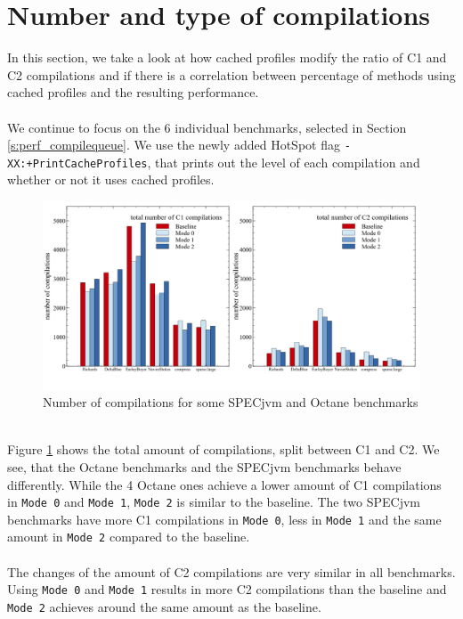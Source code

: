 \section{Number and type of compilations}
\label{s:perf_compilenumber}
In this section, we take a look at how cached profiles modify the ratio of C1 and C2 compilations and if there is a correlation between percentage of methods using cached profiles and the resulting performance.
\\\\
We continue to focus on the 6 individual benchmarks, selected in Section \ref{s:perf_compilequeue}.
We use the newly added HotSpot flag \texttt{-XX:+PrintCacheProfiles}, that prints out the level of each compilation and whether or not it uses cached profiles.
\begin{figure}[ht!]
  \begin{center}
    \centering
    \includegraphics[width=1.0\textwidth]{figures/queue_total.png}
    \caption{Number of compilations for some SPECjvm and Octane benchmarks}
    \label{f:queue_total}
  \end{center}
\end{figure}
\\
Figure \ref{f:queue_total} shows the total amount of compilations, split between C1 and C2.
We see, that the Octane benchmarks and the SPECjvm benchmarks behave differently. While the 4 Octane ones achieve a lower amount of C1 compilations in \texttt{Mode 0} and \texttt{Mode 1}, \texttt{Mode 2} is similar to the baseline. The two SPECjvm benchmarks have more C1 compilations in \texttt{Mode 0}, less in \texttt{Mode 1} and the same amount in \texttt{Mode 2} compared to the baseline.
\\\\
The changes of the amount of C2 compilations are very similar in all benchmarks. Using \texttt{Mode 0} and \texttt{Mode 1} results in more C2 compilations than the baseline and \texttt{Mode 2} achieves around the same amount as the baseline.
